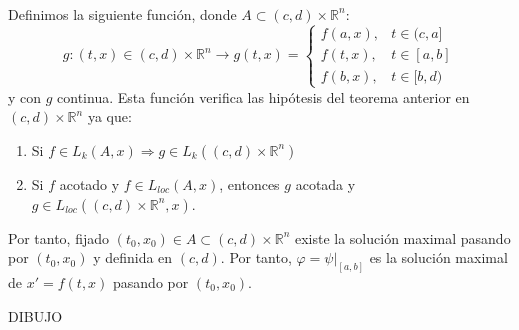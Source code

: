 \documentclass[11pt]{article}
\makeatletter
\theoremstyle{theorem-style}  %
\renewenvironment{proof}[1][\proofname]{\par
	\pushQED{\qed}%
	\normalfont \topsep6\p@\@plus6\p@\relax
	\list{}{%
		\settowidth{\leftmargin}{\quad:\hskip\labelsep}%
		\setlength{\labelwidth}{0pt}%
		\setlength{\itemindent}{-\leftmargin}%
	}%
	\item[\hskip\labelsep\itshape#1\@addpunct{:}]\ignorespaces
}{%
	\popQED\endlist\@endpefalse
}
\theoremstyle{definition-style}
\theoremstyle{example-style}
\makeatother
\begin{document}
\begin{proof}\ \\
	Definimos la siguiente función, donde $A \subset (c, d) \times \mathbb{R}^n$:
	\[g: (t, x) \in (c, d) \times \mathbb{R}^n \longrightarrow g(t, x) = \begin{cases}
	f(a, x), &t \in (c, a] \\
	f(t, x), &t \in [a, b] \\
	f(b, x), &t \in [b, d)
	\end{cases}\]
	y con $g$ continua. Esta función verifica las hipótesis del teorema anterior en $(c, d) \times \mathbb{R}^n$ ya que:
	\begin{enumerate}[-]
		\item Si $f \in L_k(A, x) \Rightarrow g \in L_k ((c, d) \times \mathbb{R}^n)$
		\item Si $f$ acotado y $f \in L_{loc} (A, x)$, entonces $g$ acotada y $g \in L_{loc} ((c, d) \times \mathbb{R}^n, x)$.
	\end{enumerate}
	Por tanto, fijado $(t_0, x_0) \in A \subset (c, d) \times \mathbb{R}^n$ existe la solución maximal pasando por $(t_0, x_0)$ y definida en $(c, d)$. Por tanto, $\varphi = \psi|_{[a, b]}$ es la solución maximal de $x' = f(t, x)$ pasando por $(t_0, x_0)$.
	
	DIBUJO
	\end{proof}
\end{document}
